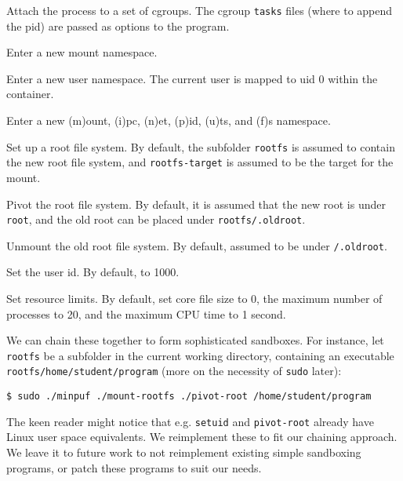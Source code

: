 \begin{description}[\setleftmargin{0.2in}\breaklabel\setlabelstyle{\tt}]

\item [cgroups] Attach the process to a set of cgroups. The cgroup
\texttt{tasks} files (where to append the pid) are passed as options to the
program.

\item [mnt] Enter a new mount namespace.

\item [user] Enter a new user namespace. The current user is mapped to uid 0
within the container.

\item [minpuf] Enter a new (m)ount, (i)pc, (n)et, (p)id, (u)ts, and (f)s
namespace.

\item [mount-rootfs] Set up a root file system. By default, the subfolder
\texttt{rootfs} is assumed to contain the new root file system, and
\texttt{rootfs-target} is assumed to be the target for the mount.

\item [pivot-root] Pivot the root file system. By default, it is assumed that
the new root is under \texttt{root}, and the old root can be placed under
\texttt{rootfs/.oldroot}.

\item [umount-oldroot] Unmount the old root file system. By default, assumed to
be under \texttt{/.oldroot}.

\item [setuid] Set the user id. By default, to 1000.

\item [rlimits] Set resource limits. By default, set core file size to 0, the
maximum number of processes to 20, and the maximum CPU time to 1 second.

\end{description}

We can chain these together to form sophisticated sandboxes. For instance, let
\texttt{rootfs} be a subfolder in the current working directory, containing an
executable \texttt{rootfs/home/student/program} (more on the necessity of
\texttt{sudo} later):

\begin{lstlisting}
$ sudo ./minpuf ./mount-rootfs ./pivot-root /home/student/program
\end{lstlisting}

The keen reader might notice that e.g. \texttt{setuid} and \texttt{pivot-root}
already have Linux user space equivalents. We reimplement these to fit our
chaining approach. We leave it to future work to not reimplement existing
simple sandboxing programs, or patch these programs to suit our needs.

